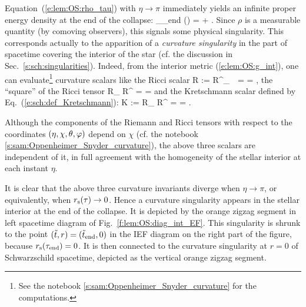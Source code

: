 Equation~(\ref{e:lem:OS:rho_tau}) with $\eta\to \pi$
immediately yields an infinite proper energy density at the end of the collapse:
\be
    \lim_{\tau\to\tau_{\rm end}} \rho(\tau) = + \infty.
\ee
Since $\rho$ is a measurable quantity (by comoving observers), this signals
some physical singularity.
This corresponds actually to the apparition of a \emph{curvature singularity}
in the part of spacetime covering the interior of the star (cf. the discussion
in Sec.~\ref{s:sch:singularities}).
Indeed, from the interior metric (\ref{e:lem:OS:g_int}), one can
evaluate\footnote{See the notebook \ref{s:sam:Oppenheimer_Snyder_curvature} for
the computations.} curvature scalars like the Ricci scalar
\be \label{e:lem:OS:Ricci_scal}
    R := R^\mu_{\ \, \mu} =  =  ,
\ee
the ``square'' of the Ricci tensor
\be \label{e:lem:OS:Ricci_squared}
    R_{\mu\nu} R^{\mu\nu} = 
    =  
\ee
and the Kretschmann
scalar defined by
Eq.~(\ref{e:sch:def_Kretschmann}):
\be \label{e:lem:OS:Kretschmann}
      K := R_{\mu\nu\rho\sigma} R^{\mu\nu\rho\sigma} = 
         =  .
\ee
\begin{remark}
Although the components of the Riemann and Ricci tensors with respect to the
coordinates $(\eta,\chi,\theta,\varphi)$ depend on $\chi$ (cf. the notebook \ref{s:sam:Oppenheimer_Snyder_curvature}),
the above three scalars are independent
of it, in full agreement with the homogeneity of the stellar interior at each
instant $\eta$.
\end{remark}

It is clear that the above three curvature invariants diverge when $\eta\to \pi$,
or equivalently, when $r_{\rm s}(\tau)\to 0$. Hence a curvature singularity
appears in the stellar interior at the end of the collapse.
It is depicted by the orange zigzag segment in left spacetime diagram
of Fig.~\ref{f:lem:OS:diag_int_EF}. This singularity is shrunk to the point
$({\tilde t}, r) = ({\tilde t}_{\rm end}, 0)$ in the IEF diagram on the right part of the figure,
because $r_{\rm s}(\tau_{\rm end}) = 0$. It is then connected to the
curvature singularity at $r=0$ of Schwarzschild spacetime, depicted as the
vertical orange zigzag segment.

